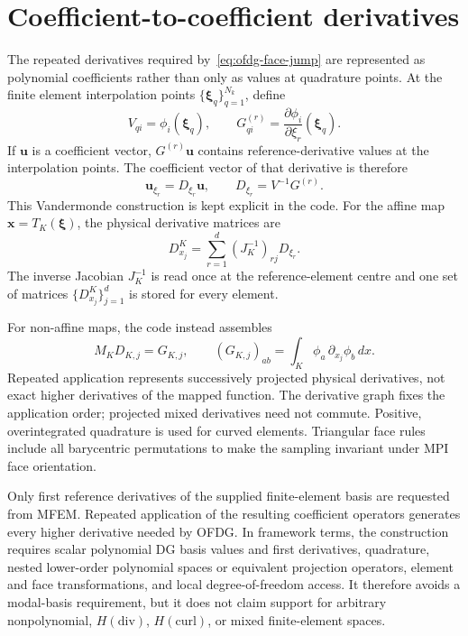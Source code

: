 \section{Coefficient-to-coefficient derivatives}

The repeated derivatives required by~\eqref{eq:ofdg-face-jump} are represented as
polynomial coefficients rather than only as values at quadrature points.  At the
finite element interpolation points $\{\boldsymbol{\xi}_q\}_{q=1}^{N_k}$, define
\begin{equation}
  V_{qi}=\phi_i(\boldsymbol{\xi}_q),
  \qquad
  G_{qi}^{(r)}
  =\frac{\partial\phi_i}{\partial\xi_r}(\boldsymbol{\xi}_q).
\end{equation}
If $\boldsymbol{u}$ is a coefficient vector, $G^{(r)}\boldsymbol{u}$ contains
reference-derivative values at the interpolation points.  The coefficient vector
of that derivative is therefore
\begin{equation}
  \boldsymbol{u}_{\xi_r}=D_{\xi_r}\boldsymbol{u},
  \qquad
  D_{\xi_r}=V^{-1}G^{(r)}.
  \label{eq:ofdg-reference-derivative-matrix}
\end{equation}
This Vandermonde construction is kept explicit in the code.  For the affine map
$\boldsymbol{x}=T_K(\boldsymbol{\xi})$, the physical derivative matrices are
\begin{equation}
  D_{x_j}^{K}
  =\sum_{r=1}^d(J_K^{-1})_{rj}D_{\xi_r}.
  \label{eq:ofdg-physical-derivative-matrix}
\end{equation}
The inverse Jacobian $J_K^{-1}$ is read once at the reference-element centre and
one set of matrices $\{D_{x_j}^{K}\}_{j=1}^d$ is stored for every element.

For non-affine maps, the code instead assembles
\begin{equation}
  M_K D_{K,j}=G_{K,j},\qquad
  (G_{K,j})_{ab}=\int_K\phi_a\,\partial_{x_j}\phi_b\,dx.
\end{equation}
Repeated application represents successively projected physical derivatives,
not exact higher derivatives of the mapped function.  The derivative graph
fixes the application order; projected mixed derivatives need not commute.
Positive, overintegrated quadrature is used for curved elements.  Triangular
face rules include all barycentric permutations to make the sampling invariant
under MPI face orientation.

Only first reference derivatives of the supplied finite-element basis are
requested from MFEM.  Repeated application of the resulting coefficient
operators generates every higher derivative needed by OFDG.  In framework
terms, the construction requires scalar polynomial DG basis values and first
derivatives, quadrature, nested lower-order polynomial spaces or equivalent
projection operators, element and face transformations, and local
degree-of-freedom access.  It therefore avoids a modal-basis requirement, but it
does not claim support for arbitrary nonpolynomial, $H(\mathrm{div})$,
$H(\mathrm{curl})$, or mixed finite-element spaces.

